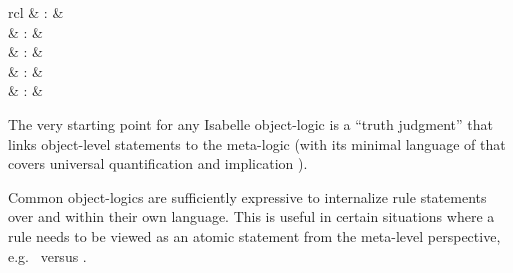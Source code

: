 \begin{isabellebody}
\begin{isamarkuptext}
\begin{description}
  \end{description}%
\end{isamarkuptext}%
\isamarkuptrue%
%
\isamarkuptrue%
%
\begin{isamarkuptext}%
\begin{matharray}{rcl}
    \hypertarget{command.judgment}{\hyperlink{command.judgment}{\mbox{}}} & : &  \\
    \hypertarget{method.atomize}{\hyperlink{method.atomize}{\mbox{}}} & : &  \\
    \hypertarget{attribute.atomize}{\hyperlink{attribute.atomize}{\mbox{}}} & : &  \\
    \hypertarget{attribute.rule-format}{\hyperlink{attribute.rule-format}{\mbox{}}} & : &  \\
    \hypertarget{attribute.rulify}{\hyperlink{attribute.rulify}{\mbox{}}} & : &  \\
  \end{matharray}

  The very starting point for any Isabelle object-logic is a ``truth
  judgment'' that links object-level statements to the meta-logic
  (with its minimal language of  that covers universal
  quantification  and implication ).

  Common object-logics are sufficiently expressive to internalize rule
  statements over  and  within their own
  language.  This is useful in certain situations where a rule needs
  to be viewed as an atomic statement from the meta-level perspective,
  e.g.\  versus .


\end{isamarkuptext}
\end{isabellebody}
